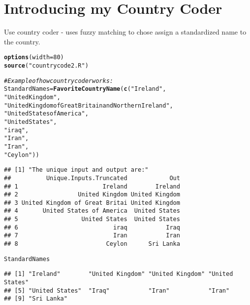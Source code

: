 \documentclass{article}\usepackage[]{graphicx}\usepackage[]{color}
\makeatletter
\newcommand{\hlnum}[1]{\textcolor[rgb]{0.686,0.059,0.569}{#1}}%
\newcommand{\hlstr}[1]{\textcolor[rgb]{0.192,0.494,0.8}{#1}}%
\newcommand{\hlcom}[1]{\textcolor[rgb]{0.678,0.584,0.686}{\textit{#1}}}%
\newcommand{\hlstd}[1]{\textcolor[rgb]{0.345,0.345,0.345}{#1}}%
\newcommand{\hlkwb}[1]{\textcolor[rgb]{0.69,0.353,0.396}{#1}}%
\newcommand{\hlkwc}[1]{\textcolor[rgb]{0.333,0.667,0.333}{#1}}%
\newcommand{\hlkwd}[1]{\textcolor[rgb]{0.737,0.353,0.396}{\textbf{#1}}}%
\newenvironment{kframe}{%
 \def\at@end@of@kframe{}%
 \ifinner\ifhmode%
  \def\at@end@of@kframe{\end{minipage}}%
  \begin{minipage}{\columnwidth}%
 \fi\fi%
 \def\FrameCommand##1{\hskip\@totalleftmargin \hskip-\fboxsep
 \colorbox{shadecolor}{##1}\hskip-\fboxsep
     \hskip-\linewidth \hskip-\@totalleftmargin \hskip\columnwidth}%
 \MakeFramed {\advance\hsize-\width
   \@totalleftmargin\z@ \linewidth\hsize
   \@setminipage}}%
 {\par\unskip\endMakeFramed%
 \at@end@of@kframe}
\newenvironment{knitrout}{}{} %
\makeatother
\begin{document}
\section{Introducing my Country Coder}

Use country coder - uses fuzzy matching to chose assign a standardized name to the country.
\begin{knitrout}
\color{fgcolor}\begin{kframe}
\begin{alltt}
\hlkwd{options}\hlstd{(}\hlkwc{width}\hlstd{=}\hlnum{80}\hlstd{)}
\hlkwd{source}\hlstd{(}\hlstr{"countrycode2.R"}\hlstd{)}

\hlcom{#Example of how country coder works: }
\hlstd{StandardNames}\hlkwb{=}\hlkwd{FavoriteCountryName}\hlstd{(}\hlkwd{c}\hlstd{(}\hlstr{"Ireland"}\hlstd{,}
                                    \hlstr{"United Kingdom"}\hlstd{,}
                                    \hlstr{"United Kingdom of Great Britain and Northern Ireland"}\hlstd{,}
                                    \hlstr{"United States of America"}\hlstd{,}
                                    \hlstr{"United States"}\hlstd{,}
                                    \hlstr{"iraq"}\hlstd{,}
                                    \hlstr{"Iran"}\hlstd{,}
                                    \hlstr{"Iran"}\hlstd{,}
                                    \hlstr{"Ceylon"}\hlstd{))}
\end{alltt}
\begin{verbatim}
## [1] "The unique input and output are:"
##          Unique.Inputs.Truncated            Out
## 1                        Ireland        Ireland
## 2                 United Kingdom United Kingdom
## 3 United Kingdom of Great Britai United Kingdom
## 4       United States of America  United States
## 5                  United States  United States
## 6                           iraq           Iraq
## 7                           Iran           Iran
## 8                         Ceylon      Sri Lanka
\end{verbatim}
\begin{alltt}
\hlstd{StandardNames}
\end{alltt}
\begin{verbatim}
## [1] "Ireland"        "United Kingdom" "United Kingdom" "United States" 
## [5] "United States"  "Iraq"           "Iran"           "Iran"          
## [9] "Sri Lanka"
\end{verbatim}
\end{kframe}
\end{knitrout}
\end{document}
